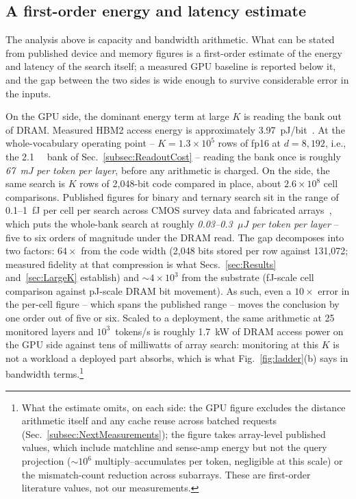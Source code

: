 \subsection{A first-order energy and latency estimate}
\label{subsec:CostModelGap}
The analysis above is capacity and bandwidth arithmetic. What can be
stated from published device and memory figures is a first-order
estimate of the energy and latency of the search itself; a measured
GPU baseline is reported below it, and the gap between the two sides
is wide enough to survive considerable error in the inputs.

On the GPU side, the dominant energy term at large $K$ is reading the
bank out of DRAM. Measured HBM2 access energy is approximately
3.97~pJ/bit~\cite{oconnor2017fgdram}. At the whole-vocabulary
operating point -- $K=1.3\!\times\!10^{5}$ rows of fp16 at $d=8{,}192$,
i.e., the \qty{2.1}{\giga\byte} bank of
Sec.~\ref{subsec:ReadoutCost} -- reading the bank once is roughly
\emph{67~mJ per token per layer}, before any arithmetic is charged. On
the \cam side, the same search is $K$ rows of 2{,}048-bit code compared
in place, about $2.6\!\times\!10^{8}$ cell comparisons. Published
figures for binary and ternary \cam search sit in the range of
0.1--1~fJ per cell per search across CMOS survey data and fabricated
\fefet arrays~\cite{pagiamtzis2006cam,ni2019fetcam,liu2022evacam},
which puts the whole-bank search at roughly \emph{0.03--0.3~$\mu$J per
token per layer} -- five to six orders of magnitude under the DRAM
read. The gap decomposes into two factors: $64\times$ from the code
width (2{,}048 bits stored per row against 131{,}072; measured
fidelity at that compression is what Secs.~\ref{sec:Results}
and~\ref{sec:LargeK} establish) and $\sim$$4\!\times\!10^{3}$ from the
substrate (fJ-scale cell comparison against pJ-scale DRAM bit
movement). As such, even a $10\times$ error in the per-cell figure --
which spans the published range -- moves the conclusion by one order
out of five or six. Scaled to a deployment, the same arithmetic at 25
monitored layers and $10^{3}$~tokens/s is roughly 1.7~kW of DRAM
access power on the GPU side against tens of milliwatts of array
search: monitoring at this $K$ is not a workload a deployed part
absorbs, which is what Fig.~\ref{fig:ladder}(b) says in bandwidth
terms.\footnote{What the estimate omits, on each side: the GPU figure
excludes the distance arithmetic itself and any cache reuse across
batched requests (Sec.~\ref{subsec:NextMeasurements}); the \cam figure
takes array-level published values, which include matchline and
sense-amp energy but not the query projection ($\sim$$10^{6}$
multiply--accumulates per token, negligible at this scale) or the
mismatch-count reduction across subarrays. These are first-order
literature values, not our measurements.}

